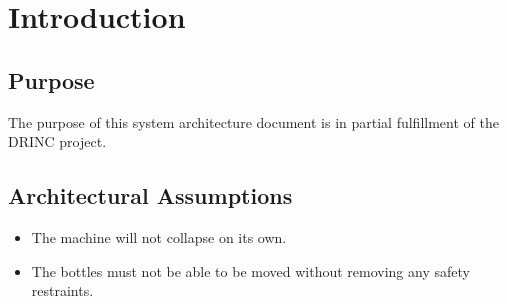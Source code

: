 \setcounter{page}{1}

\chapter{Introduction}

\section{Purpose}

The purpose of this system architecture document is in partial fulfillment of 
the DRINC project.

\section{Architectural Assumptions}

\begin{itemize}
    \item The machine will not collapse on its own.
    \item The bottles must not be able to be moved without removing any safety 
          restraints.
\end{itemize}
